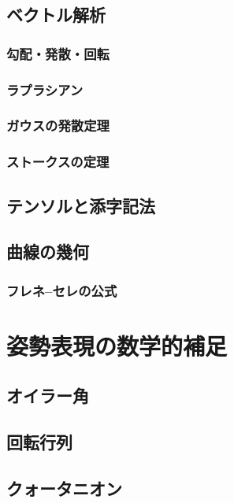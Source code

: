 \documentclass[uplatex,dvipdfmx,a4j,11pt]{jsreport}
\numberwithin{equation}{chapter}
\begin{document}
\section{ベクトル解析}

\subsection{勾配・発散・回転}

\subsection{ラプラシアン}

\subsection{ガウスの発散定理}

\subsection{ストークスの定理}

\section{テンソルと添字記法}

\section{曲線の幾何}

\subsection{フレネ--セレの公式}

\chapter{姿勢表現の数学的補足}

\section{オイラー角}

\section{回転行列}

\section{クォータニオン}
\end{document}
